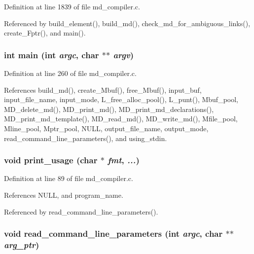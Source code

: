 Definition at line 1839 of file md\_\-compiler.c.

Referenced by build\_\-element(), build\_\-md(), check\_\-md\_\-for\_\-ambiguous\_\-links(), create\_\-Fptr(), and main().
\subsubsection{\setlength{\rightskip}{0pt plus 5cm}int main (int {\em argc}, char $\ast$$\ast$ {\em argv})}\label{md__compiler_8c_3c04138a5bfe5d72780bb7e82a18e627}




Definition at line 260 of file md\_\-compiler.c.

References build\_\-md(), create\_\-Mbuf(), free\_\-Mbuf(), input\_\-buf, input\_\-file\_\-name, input\_\-mode, L\_\-free\_\-alloc\_\-pool(), L\_\-punt(), Mbuf\_\-pool, MD\_\-delete\_\-md(), MD\_\-print\_\-md(), MD\_\-print\_\-md\_\-declarations(), MD\_\-print\_\-md\_\-template(), MD\_\-read\_\-md(), MD\_\-write\_\-md(), Mfile\_\-pool, Mline\_\-pool, Mptr\_\-pool, NULL, output\_\-file\_\-name, output\_\-mode, read\_\-command\_\-line\_\-parameters(), and using\_\-stdin.
\subsubsection{\setlength{\rightskip}{0pt plus 5cm}void print\_\-usage (char $\ast$ {\em fmt},  {\em ...})}\label{md__compiler_8c_62ac7a1cfa066f61a3317977c936b8f2}




Definition at line 89 of file md\_\-compiler.c.

References NULL, and program\_\-name.

Referenced by read\_\-command\_\-line\_\-parameters().
\subsubsection{\setlength{\rightskip}{0pt plus 5cm}void read\_\-command\_\-line\_\-parameters (int {\em argc}, char $\ast$$\ast$ {\em arg\_\-ptr})}\label{md__compiler_8c_b5ad1e75f3e95a8372855846f911efe1}




